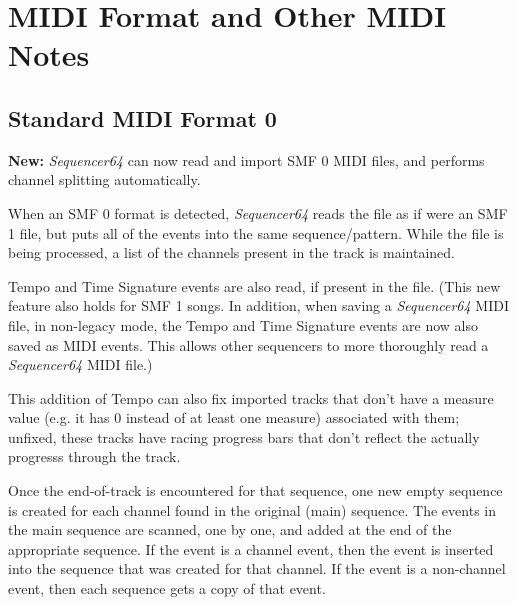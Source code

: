 %
%
%

\section{MIDI Format and Other MIDI Notes}
\label{sec:midi_format_and_midi_notes}

\subsection{Standard MIDI Format 0}
\label{subsec:midi_format_smf_0}

   \textbf{New:}
   \textsl{Sequencer64} can now read and import SMF 0 MIDI files, and performs
   channel splitting automatically.

   When an SMF 0 format is detected, \textsl{Sequencer64}
   reads the file as if were an SMF 1 file, but puts all of the events into the
   same sequence/pattern.  While the file is being processed, a list of the
   channels present in the track is maintained.

   Tempo and Time Signature events are also read, if present in the file.
   (This new feature also holds for SMF 1 songs.
   In addition, when saving a \textsl{Sequencer64} MIDI file, in non-legacy
   mode, the Tempo and Time Signature events are now also saved as MIDI events.
   This allows other sequencers to more thoroughly read a \textsl{Sequencer64}
   MIDI file.)
   
   This addition of Tempo can also fix imported tracks that don't have a
   measure value (e.g. it has 0 instead of at least one measure) associated
   with them; unfixed, these tracks have racing progress bars that don't
   reflect the actually progresss through the track.

   Once the end-of-track is encountered for that sequence, one new empty
   sequence is created for each channel found in the original (main) sequence.
   The events in the main sequence are scanned, one by one, and added at the
   end of the appropriate sequence.  If the event is a channel event,
   then the event is inserted into the sequence that was created for that
   channel.  If the event is a non-channel event, then each sequence gets a
   copy of that event.


